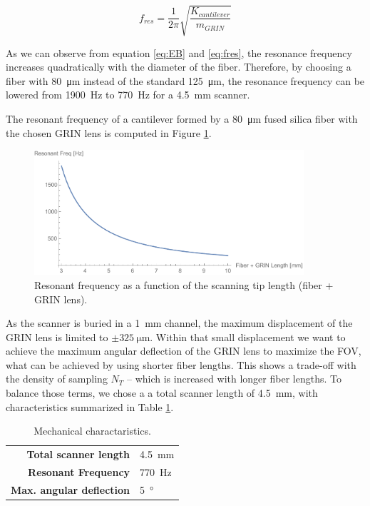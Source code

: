 \begin{equation}
f_{res} = \frac{1}{2 \pi} \sqrt{\frac{K_{cantilever}}{m_{\mathit{GRIN}}}} 
\label{eq:fres}
\end{equation}

As we can observe from equation \ref{eq:EB} and \ref{eq:fres}, the resonance frequency increases quadratically with the diameter of the fiber. Therefore, by choosing a fiber with \SI{80}{\micro\meter} instead of the standard \SI{125}{\micro\meter}, the resonance frequency can be lowered from \SI{1900}{\hertz} to \SI{770}{\hertz} for a \SI{4.5}{\milli\meter} scanner.

The resonant frequency of a cantilever formed by a \SI{80}{\micro\meter} fused silica fiber with the chosen GRIN lens is computed in Figure \ref{fig:freq}.

\begin{figure}[h!]\centering
      \includegraphics[width=10cm]{figures/30_DesignSimulation/Mechanical/fres.pdf}
      \caption{Resonant frequency as a function of the scanning tip length (fiber + GRIN lens).}
      \label{fig:freq}
\end{figure}

As the scanner is buried in a \SI{1}{\milli\meter} channel, the maximum displacement of the GRIN lens is limited to $\pm\SI{325}{\micro\meter}$. Within that small displacement we want to achieve the maximum angular deflection of the GRIN lens to maximize the FOV, what can be achieved by using shorter fiber lengths. This shows a trade-off with the density of sampling $N_{T}$ -- which is increased with longer fiber lengths. To balance those terms, we chose a a total scanner length of \SI{4.5}{\milli\meter}, with characteristics summarized in Table \ref{tab:mech}.

\begin{table}[h!]\centering
	\begin{tabular}{rl}\\
		\hline
		\textbf{Total scanner length} & \SI{4.5}{\milli\meter} \\ 
		\textbf{Resonant Frequency} & \SI{770}{\hertz} \\ 
		\textbf{Max. angular deflection} & \SI{5}{\degree} \\ 
		\hline
	\end{tabular} 
    \caption{Mechanical charactaristics.}
    \label{tab:mech}
\end{table}

